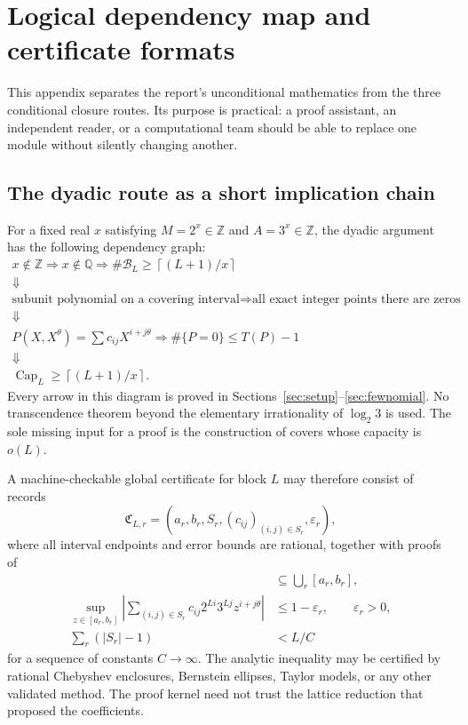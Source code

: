 \documentclass[11pt,oneside]{article}
\theoremstyle{definition}
\theoremstyle{remark}
\newcommand{\Z}{\mathbb Z}
\newcommand{\Q}{\mathbb Q}
\newcommand{\tht}{\theta}
\newcommand{\ceil}[1]{\left\lceil#1\right\rceil}
\begin{document}
\appendix

\section{Logical dependency map and certificate formats}
\label{app:dependencies}

This appendix separates the report's unconditional mathematics from the three conditional closure
routes.  Its purpose is practical: a proof assistant, an independent reader, or a computational
team should be able to replace one module without silently changing another.

\subsection{The dyadic route as a short implication chain}

For a fixed real $x$ satisfying $M=2^x\in\Z$ and $A=3^x\in\Z$, the dyadic argument has the
following dependency graph:
\[
\begin{array}{c}
 x\notin\Z
 \Longrightarrow x\notin\Q
 \Longrightarrow \#\mathcal B_L\ge \ceil{(L+1)/x}
 \\
 \Downarrow
 \\
 \text{subunit polynomial on a covering interval}
 \Longrightarrow \text{all exact integer points there are zeros}
 \\
 \Downarrow
 \\
 P(X,X^\tht)=\sum c_{ij}X^{i+j\tht}
 \Longrightarrow \#\{P=0\}\le T(P)-1
 \\
 \Downarrow
 \\
 \operatorname{Cap}_L\ge \ceil{(L+1)/x}.
\end{array}
\]
Every arrow in this diagram is proved in Sections~\ref{sec:setup}--\ref{sec:fewnomial}.  No
transcendence theorem beyond the elementary irrationality of $\log_2 3$ is used.  The sole missing
input for a proof is the construction of covers whose capacity is $o(L)$.

A machine-checkable global certificate for block $L$ may therefore consist of records
\begin{equation}
 \mathfrak C_{L,r}=(a_r,b_r,S_r,(c_{ij})_{(i,j)\in S_r},\varepsilon_r),
 \label{eq:cover-record}
\end{equation}
where all interval endpoints and error bounds are rational, together with proofs of
\begin{align}
 [1,2]&\subseteq\bigcup_r[a_r,b_r],
 \label{eq:cover-check-a}\\
 \sup_{z\in[a_r,b_r]}
 \left|\sum_{(i,j)\in S_r}c_{ij}2^{Li}3^{Lj}z^{i+j\tht}\right|
 &\le1-\varepsilon_r,
 \qquad \varepsilon_r>0,
 \label{eq:cover-check-b}\\
 \sum_r(|S_r|-1)&<L/C
 \label{eq:cover-check-c}
\end{align}
for a sequence of constants $C\to\infty$.  The analytic inequality may be certified by rational
Chebyshev enclosures, Bernstein ellipses, Taylor models, or any other validated method.  The proof
kernel need not trust the lattice reduction that proposed the coefficients.
\end{document}
